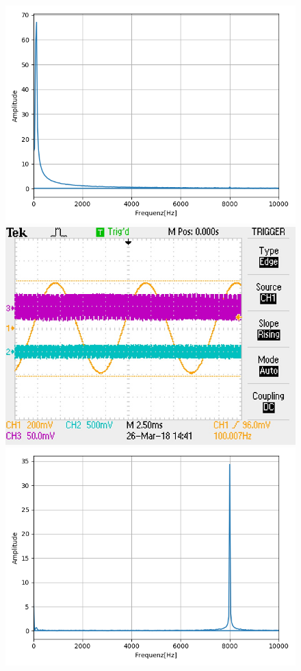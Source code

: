 \documentclass[12pt,a4paper]{article}
\begin{document}
\begin{figure}
\includegraphics[scale=0.5]{Bilder/Vorversuch3/Vor3_4.png}
\includegraphics[scale=0.9]{Bilder/Vorversuch3/F0005TEK.JPG}
\includegraphics[scale=0.5]{Bilder/Vorversuch3/Vor3_5.png}

\end{figure}
\end{document}

